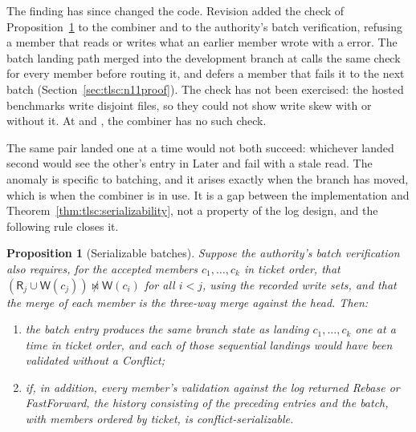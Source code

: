 \documentclass[11pt,letterpaper]{article}
\newtheorem{proposition}[theorem]{Proposition}
\theoremstyle{definition}
\theoremstyle{remark}
\newcommand{\R}{\mathsf{R}}
\newcommand{\W}{\mathsf{W}}
\newcommand{\nmeets}{\not\bowtie}
\newcommand{\Later}{\mathrm{Later}}
\begin{document}
The finding has since changed the code. Revision  added the check of Proposition~\ref{prop:tlsc:batchfix} to the combiner and to the authority's batch verification, refusing a member that reads or writes what an earlier member wrote with a  error. The batch landing path merged into the development branch at  calls the same check for every member before routing it, and defers a member that fails it to the next batch (Section~\ref{sec:tlsc:n11proof}). The check has not been exercised: the hosted benchmarks write disjoint files, so they could not show write skew with or without it. At  and , the combiner has no such check.

The same pair landed one at a time would not both succeed: whichever landed second would see the other's entry in $\Later$ and fail with a stale read. The anomaly is specific to batching, and it arises exactly when the branch has moved, which is when the combiner is in use. It is a gap between the implementation and Theorem~\ref{thm:tlsc:serializability}, not a property of the log design, and the following rule closes it.

\begin{proposition}[Serializable batches]
\label{prop:tlsc:batchfix}
Suppose the authority's batch verification also requires, for the accepted members $c_1,\dots,c_k$ in ticket order, that $(\R_j\cup\W(c_j))\nmeets\W(c_i)$ for all $i<j$, using the recorded write sets, and that the merge of each member is the three-way merge against the head. Then:
\begin{enumerate}
\item the batch entry produces the same branch state as landing $c_1,\dots,c_k$ one at a time in ticket order, and each of those sequential landings would have been validated without a Conflict;
\item if, in addition, every member's validation against the log returned Rebase or FastForward, the history consisting of the preceding entries and the batch, with members ordered by ticket, is conflict-serializable.
\end{enumerate}
\end{proposition}
\end{document}
